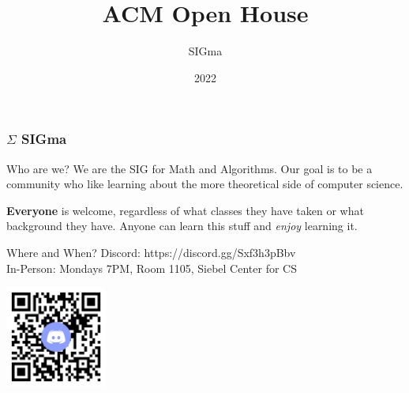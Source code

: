 \documentclass{beamer}
\title{ACM Open House}
\author{SIGma}
\institute{ACM}
\date{2022}
\begin{document}
\beamertemplatenavigationsymbolsempty

\begin{frame}
\frametitle{$\Sigma$ SIGma}

\begin{block}{Who are we?}
We are the SIG for Math and Algorithms. Our goal is to be a community who like learning about the more theoretical side of computer science.

\textbf{Everyone} is welcome, regardless of what classes they have taken or what background they have. Anyone can learn this stuff and \textit{enjoy} learning it.
\end{block}

\begin{block}{Where and When?}
Discord: https://discord.gg/Sxf3h3pBbv\\ %
In-Person: Mondays 7PM, Room 1105, Siebel Center for CS 
\end{block}

\centering
\includegraphics[width=0.25\textwidth]{qr-code.png}

\end{frame}
\end{document}
